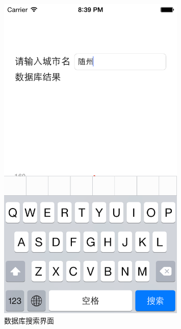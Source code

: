 \documentclass[UTF8,nofonts]{ctexart}
\begin{document}
\begin{figure}[hbt]
\centering
\includegraphics[width=0.8\textwidth]{8.png}
\caption{数据库搜索界面}
\end{figure}
\end{document}
